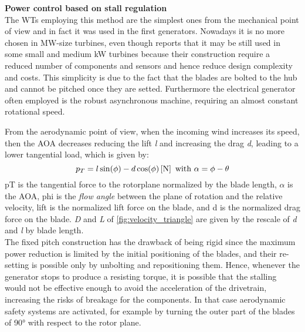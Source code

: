 \textbf{Power control based on stall regulation}\\
The \acrshort{WTs} employing this method are the simplest ones from the mechanical point of view and in fact it was used in the first generators. Nowadays it is no more chosen in MW-size turbines, even though \cite{Grasso_2016} reports that it may be still used in some small and medium kW turbines because their construction require a reduced number of components and sensors and hence reduce design complexity and costs. This simplicity is due to the fact that the blades are bolted to the hub and cannot be pitched once they are setted. Furthermore the electrical generator often employed is the robust asynchronous machine, requiring an almost constant rotational speed.

From the aerodynamic point of view, when the incoming wind increases its speed, then the \acrshort{AOA} decreases reducing the lift \textit{l} and increasing the drag \textit{d}, leading to a lower tangential load, which is given by:
\begin{equation}
  p_T = l \sin(\phi) - d \cos(\phi) \left[\si{\newton}\right] \text{ with } \alpha = \phi - \theta
  \label{eq:tangential_load}
\end{equation}
\acrshort{pT} is the tangential force to the rotorplane normalized by the blade length, $\alpha$ is the \acrshort{AOA}, \acrshort{phi} is the \textit{flow angle} between the plane of rotation and the relative velocity, \acrshort{lift} is the normalized lift force on the blade, and \acrshort{d} is the normalized drag force on the blade. \textit{D} and \textit{L} of \autoref{fig:velocity_triangle} are given by the rescale of \textit{d} and \textit{l} by blade length.\\

The fixed pitch construction has the drawback of being rigid since the maximum power reduction is limited by the initial positioning of the blades, and their re-setting is possible only by unbolting and repositioning them. Hence, whenever the generator stops to produce a resisting torque, it is possible that the stalling would not be effective enough to avoid the acceleration of the drivetrain, increasing the risks of breakage for the components. In that case aerodynamic safety systems are activated, for example by turning the outer part of the blades of 90$\si{\degree}$ with respect to the rotor plane. 


